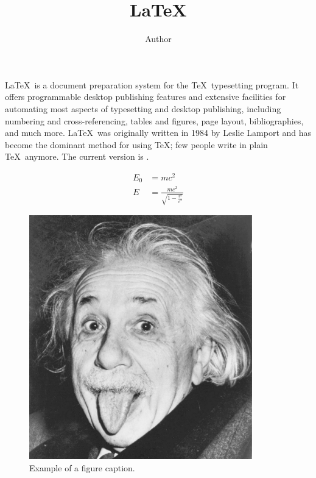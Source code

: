 \documentclass{scrarticle}
\title{\LaTeX}
\author{Author}
\begin{document}
\maketitle

\LaTeX\ is a document preparation system for the \TeX\ typesetting program. It offers programmable desktop publishing features and extensive facilities for automating most aspects of typesetting and desktop publishing, including numbering and  cross-referencing, tables and figures, page layout, bibliographies, and much more. \LaTeX\ was originally written in 1984 by Leslie Lamport and has become the  dominant method for using \TeX; few people write in plain \TeX\ anymore. The current version is \LaTeXe.

\begin{align}
E_0 &= mc^2 \\
E &= \frac{mc^2}{\sqrt{1-\frac{v^2}{c^2}}}
\end{align}

\begin{figure}[htbp]
\centerline{\includegraphics[width=0.3\linewidth]{einstein}}
\caption{Example of a figure caption.}
\label{fig}
\end{figure}
\end{document}
